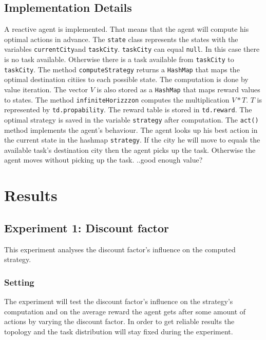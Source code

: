 \documentclass[11pt]{article}
\begin{document}
\subsection{Implementation Details}
A reactive agent is implemented. That means that the agent will compute his optimal actions in advance. 
The {\tt state} class represents the states with the variables {\tt currentCity}and {\tt taskCity}. {\tt taskCity} can equal {\tt null}. In this case there is no task available. Otherwise there is a task available from {\tt taskCity} to {\tt taskCity}. 
The method {\tt computeStrategy} returns a {\tt HashMap} that maps the optimal destination citiies to each possible state. The computation is done by value iteration. The vector \(V\) is also stored as a {\tt HashMap} that maps reward values to states. 
The method {\tt infiniteHorizzzon} computes the multiplication \(V*T\). \(T\) is represented by {\tt td.propability}. 
The reward table is stored in {\tt td.reward}. The optimal strategy is saved in the variable {\tt strategy} after computation.
The {\tt act()} method implements the agent's behaviour. The agent looks up his best action in the current state in the hashmap {\tt strategy}. If the city he will move to equals the available task's destination city then the agent picks up the task. Otherwise the agent moves without picking up the task. ..good enough value?


\section{Results}

\subsection{Experiment 1: Discount factor}
This experiment analyses the discount factor's influence on the computed strategy.  

\subsubsection{Setting}
The experiment will test the discount factor's influence on the strategy's computation and on the average reward the agent gets after some amount of actions by varying the discount factor. In order to get reliable results the topology and the task distribution will stay fixed during the experiment. 
\end{document}
